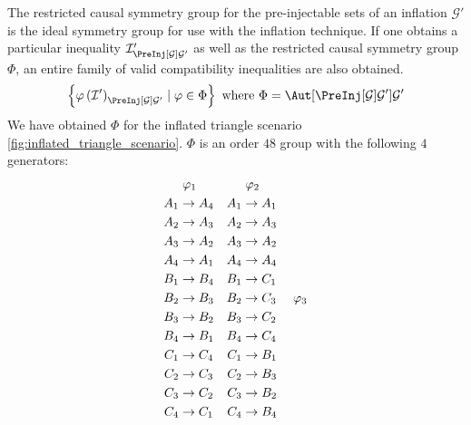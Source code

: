 \documentclass[aps, 10pt, english, twoside, pra, nofootinbib, longbibliography]{revtex4-1}
\theoremstyle{plain}
\theoremstyle{definition}
\theoremstyle{remark}
\newcommand{\graph}{\mathcal{G}}
\begin{document}
    The restricted causal symmetry group for the pre-injectable sets of an inflation $\graph'$ is the ideal symmetry group for use with the inflation technique. If one obtains a particular inequality $\mathcal{I}'_{\PreInj[\graph]{\graph'}}$ as well as the restricted causal symmetry group $\Phi$, an entire family of valid compatibility inequalities are also obtained.
    \[ \bc{\varphi\br{\mathcal{I}'}_{\PreInj[\graph]{\graph'}} \mid \varphi \in \Phi} \text{ where } \Phi = \Aut[\PreInj[\graph]{\graph'}]{\graph'} \]
    We have obtained $\Phi$ for the inflated triangle scenario \cref{fig:inflated_triangle_scenario}. $\Phi$ is an order $48$ group with the following $4$ generators:
    \begin{equation*}
    \begin{aligned}[c]
    &\hspace{1mm}\varphi_1 \\
    A_1 &\to A_4 \\A_2 &\to A_3 \\A_3 &\to A_2 \\A_4 &\to A_1 \\B_1 &\to B_4 \\B_2 &\to B_3 \\B_3 &\to B_2 \\B_4 &\to B_1 \\C_1 &\to C_4 \\C_2 &\to C_3 \\C_3 &\to C_2 \\C_4 &\to C_1
    \end{aligned}
    \quad
    \begin{aligned}[c]
    &\hspace{1mm}\varphi_2 \\
    A_1 &\to A_1 \\A_2 &\to A_3 \\A_3 &\to A_2 \\A_4 &\to A_4 \\B_1 &\to C_1 \\B_2 &\to C_3 \\B_3 &\to C_2 \\B_4 &\to C_4 \\C_1 &\to B_1 \\C_2 &\to B_3 \\C_3 &\to B_2 \\C_4 &\to B_4
    \end{aligned}
    \quad
    \begin{aligned}[c]
    &\hspace{1mm}\varphi_3 \\

\end{aligned}
\end{equation*}
\end{document}
